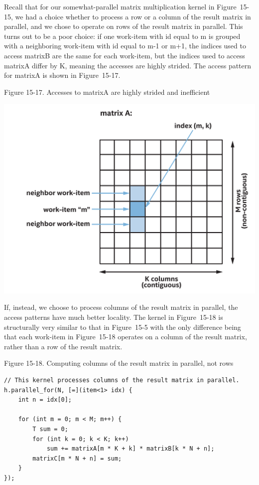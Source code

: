 Recall that for our somewhat-parallel matrix multiplication kernel in Figure 15-15, we had a choice whether to process a row or a column of the result matrix in parallel, and we chose to operate on rows of the result matrix in parallel. This turns out to be a poor choice: if one work-item with id equal to m is grouped with a neighboring work-item with id equal to m-1 or m+1, the indices used to access matrixB are the same for each work-item, but the indices used to access matrixA differ by K, meaning the accesses are highly strided. The access pattern for matrixA is shown in Figure 15-17.\par

\hspace*{\fill} \par %
Figure 15-17. Accesses to matrixA are highly strided and inefficient
\begin{center}
	\includegraphics[width=1.0\textwidth]{content/chapter-15/images/13}
\end{center}

If, instead, we choose to process columns of the result matrix in parallel, the access patterns have much better locality. The kernel in Figure 15-18 is structurally very similar to that in Figure 15-5 with the only difference being that each work-item in Figure 15-18 operates on a column of the result matrix, rather than a row of the result matrix.\par

\hspace*{\fill} \par %
Figure 15-18. Computing columns of the result matrix in parallel, not rows
\begin{lstlisting}[caption={}]
// This kernel processes columns of the result matrix in parallel.
h.parallel_for(N, [=](item<1> idx) {
	int n = idx[0];
	
	for (int m = 0; m < M; m++) {
		T sum = 0;
		for (int k = 0; k < K; k++)
			sum += matrixA[m * K + k] * matrixB[k * N + n];
		matrixC[m * N + n] = sum;
	}
});
\end{lstlisting}


